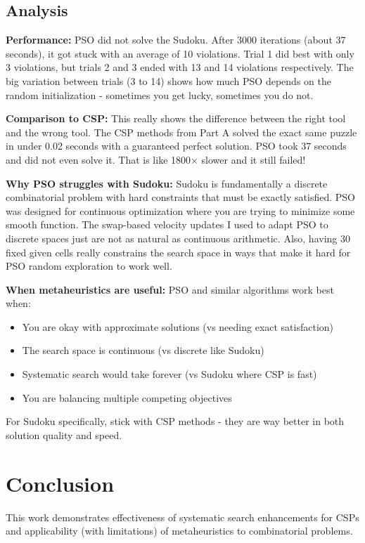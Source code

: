 \documentclass[letterpaper]{article}
\begin{document}
\subsection{Analysis}

\textbf{Performance:} PSO did not solve the Sudoku. After 3000 iterations (about 37 seconds), it got stuck with an average of 10 violations. Trial 1 did best with only 3 violations, but trials 2 and 3 ended with 13 and 14 violations respectively. The big variation between trials (3 to 14) shows how much PSO depends on the random initialization - sometimes you get lucky, sometimes you do not.

\textbf{Comparison to CSP:} This really shows the difference between the right tool and the wrong tool. The CSP methods from Part A solved the exact same puzzle in under 0.02 seconds with a guaranteed perfect solution. PSO took 37 seconds and did not even solve it. That is like 1800× slower and it still failed!

\textbf{Why PSO struggles with Sudoku:} Sudoku is fundamentally a discrete combinatorial problem with hard constraints that must be exactly satisfied. PSO was designed for continuous optimization where you are trying to minimize some smooth function. The swap-based velocity updates I used to adapt PSO to discrete spaces just are not as natural as continuous arithmetic. Also, having 30 fixed given cells really constrains the search space in ways that make it hard for PSO random exploration to work well.

\textbf{When metaheuristics are useful:} PSO and similar algorithms work best when:
\begin{itemize}
\item You are okay with approximate solutions (vs needing exact satisfaction)
\item The search space is continuous (vs discrete like Sudoku)
\item Systematic search would take forever (vs Sudoku where CSP is fast)
\item You are balancing multiple competing objectives
\end{itemize}

For Sudoku specifically, stick with CSP methods - they are way better in both solution quality and speed.

\section{Conclusion}

This work demonstrates effectiveness of systematic search enhancements for CSPs and applicability (with limitations) of metaheuristics to combinatorial problems.
\end{document}
